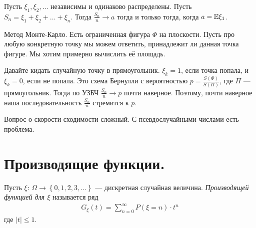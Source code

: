 \documentclass[../main.tex]{subfiles}
\begin{document}
\begin{thm}
 Пусть $ \xi_1, \xi_2, \ldots $  независимы и одинаково распределены. Пусть $ S_n  = \xi_1 + \xi_2 + \ldots + \xi_n $. Тогда $ \frac{S_n}{n} \to a $ тогда и только тогда, когда $ a = \mathbb E \xi_1 $.
\end{thm}

\begin{exmpl}
 Метод Монте-Карло. Есть ограниченная фигура $ \Phi $ на плоскости. Пусть про любую конкретную точку мы можем ответить, принадлежит ли данная точка фигуре. Мы хотим примерно вычислить её площадь.

 Давайте кидать случайную точку в прямоугольник. $ \xi_k = 1 $, если точка попала, и $ \xi_k = 0 $, если не попала. Это схема Бернулли с вероятностью $ p = \frac{S(\Phi)}{S(\Pi)} $, где $ \Pi $ --- прямоугольник. Тогда по УЗБЧ  $ \frac{S_n}{n} \to p $  почти наверное. Поэтому, почти наверное наша последовательность $ \frac{S_n}{n} $ стремится к $ p $.

 Вопрос о скорости сходимости сложный. С псевдослучайными числами есть проблема.
\end{exmpl}

\newpage
\section{Производящие функции.}

\begin{df}
 Пусть $ \xi \colon\, \Omega \to \left\{ 0, 1, 2, 3, \ldots \right\} $ --- дискретная случайная величина. \textit{Производящей функцией для $ \xi $} называется ряд
 \begin{align*}
  G_\xi(t) = \sum_{n=0}^{\infty}P(\xi = n) \cdot t^{n}
 \end{align*} где $ \left| t \right| \leqslant 1 $.
\end{df}
\end{document}
